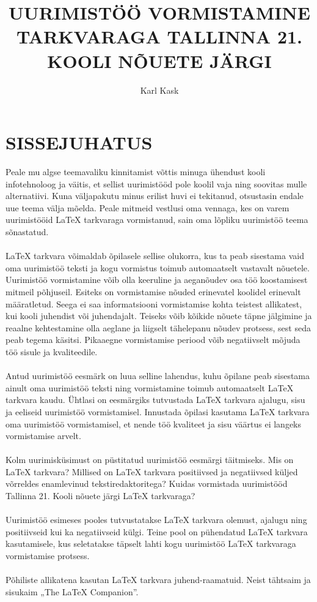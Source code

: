 \documentclass{21kuur}
\title{UURIMISTÖÖ VORMISTAMINE \latex TARKVARAGA TALLINNA 21. KOOLI NÕUETE JÄRGI}
\author{Karl Kask}
\begin{document}
\maketitle
\tableofcontents

\chapter*{SISSEJUHATUS}
Peale mu algse teemavaliku kinnitamist võttis minuga ühendust kooli infotehnoloog ja väitis, et sellist uurimistööd pole koolil vaja ning soovitas mulle alternatiivi. Kuna väljapakutu minus erilist huvi ei tekitanud, otsustasin endale uue teema välja mõelda. Peale mitmeid vestlusi oma vennaga, kes on varem uurimistööid LaTeX tarkvaraga vormistanud, sain oma lõpliku uurimistöö teema sõnastatud.
\\\\LaTeX tarkvara võimaldab õpilasele sellise olukorra, kus ta peab sisestama vaid oma uurimistöö teksti ja kogu vormistus toimub automaatselt vastavalt nõuetele. Uurimistöö vormistamine võib olla keeruline ja aeganõudev osa töö koostamisest mitmeil põhjuseil. Esiteks on vormistamise nõuded erinevatel koolidel erinevalt määratletud. Seega ei saa informatsiooni vormistamise kohta teistest allikatest, kui kooli juhendist või juhendajalt. Teiseks võib kõikide nõuete täpne jälgimine ja reaalne kehtestamine olla aeglane ja liigselt tähelepanu nõudev protsess, sest seda peab tegema käsitsi. Pikaaegne vormistamise periood võib negatiivselt mõjuda töö sisule ja kvaliteedile.
\\\\Antud uurimistöö eesmärk on luua selline lahendus, kuhu õpilane peab sisestama ainult oma uurimistöö teksti ning vormistamine toimub automaatselt LaTeX tarkvara kaudu. Ühtlasi on eesmärgiks tutvustada LaTeX tarkvara ajalugu, sisu ja eeliseid uurimistöö vormistamisel. Innustada õpilasi kasutama LaTeX tarkvara oma uurimistöö vormistamisel, et nende töö kvaliteet ja sisu väärtus ei langeks vormistamise arvelt. 
\\\\Kolm uurimisküsimust on püstitatud uurimistöö eesmärgi täitmiseks. Mis on LaTeX tarkvara? Millised on LaTeX tarkvara positiivsed ja negatiivsed küljed võrreldes enamlevinud tekstiredaktoritega? Kuidas vormistada uurimistööd Tallinna 21. Kooli nõuete järgi LaTeX tarkvaraga?
\\\\Uurimistöö esimeses pooles tutvustatakse LaTeX tarkvara olemust, ajalugu ning positiivseid kui ka negatiivseid külgi. Teine pool on pühendatud LaTeX tarkvara kasutamisele, kus seletatakse täpselt lahti kogu uurimistöö LaTeX tarkvaraga vormistamise protsess.
\\\\Põhiliste allikatena kasutan LaTeX tarkvara juhend-raamatuid. Neist tähtsaim ja sisukaim „The LaTeX Companion”.
\end{document}
